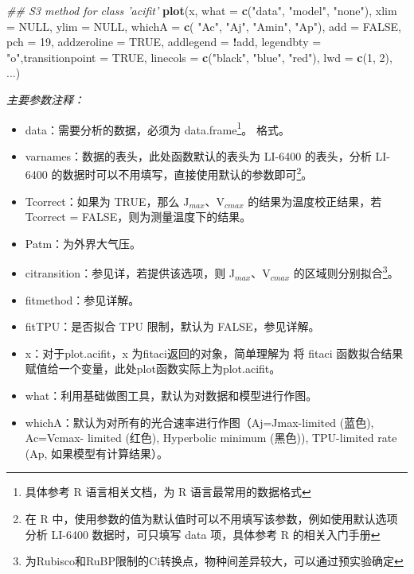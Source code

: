 \documentclass[
]{krantz}
\makeatletter
\newenvironment{Shaded}{\begin{snugshade}}{\end{snugshade}}
\newcommand{\CommentTok}[1]{\textcolor[rgb]{0.56,0.35,0.01}{\textit{#1}}}
\newcommand{\DataTypeTok}[1]{\textcolor[rgb]{0.13,0.29,0.53}{#1}}
\newcommand{\DecValTok}[1]{\textcolor[rgb]{0.00,0.00,0.81}{#1}}
\newcommand{\KeywordTok}[1]{\textcolor[rgb]{0.13,0.29,0.53}{\textbf{#1}}}
\newcommand{\NormalTok}[1]{#1}
\newcommand{\OperatorTok}[1]{\textcolor[rgb]{0.81,0.36,0.00}{\textbf{#1}}}
\newcommand{\OtherTok}[1]{\textcolor[rgb]{0.56,0.35,0.01}{#1}}
\newcommand{\StringTok}[1]{\textcolor[rgb]{0.31,0.60,0.02}{#1}}
\providecommand{\tightlist}{%
  \setlength{\itemsep}{0pt}\setlength{\parskip}{0pt}}
\newenvironment{kframe}{%
\medskip{}
\setlength{\fboxsep}{.8em}
 \def\at@end@of@kframe{}%
 \ifinner\ifhmode%
  \def\at@end@of@kframe{\end{minipage}}%
  \begin{minipage}{\columnwidth}%
 \fi\fi%
 \def\FrameCommand##1{\hskip\@totalleftmargin \hskip-\fboxsep
 \colorbox{shadecolor}{##1}\hskip-\fboxsep
     \hskip-\linewidth \hskip-\@totalleftmargin \hskip\columnwidth}%
 \MakeFramed {\advance\hsize-\width
   \@totalleftmargin\z@ \linewidth\hsize
   \@setminipage}}%
 {\par\unskip\endMakeFramed%
 \at@end@of@kframe}
\renewenvironment{Shaded}{\begin{kframe}}{\end{kframe}}
\makeatother
\begin{document}
\begin{Shaded}
\begin{Highlighting}[]
\CommentTok{## S3 method for class 'acifit'}
\KeywordTok{plot}\NormalTok{(x, }\DataTypeTok{what =} \KeywordTok{c}\NormalTok{(}\StringTok{"data"}\NormalTok{, }\StringTok{"model"}\NormalTok{, }\StringTok{"none"}\NormalTok{),}
     \DataTypeTok{xlim =} \OtherTok{NULL}\NormalTok{, }\DataTypeTok{ylim =} \OtherTok{NULL}\NormalTok{, }\DataTypeTok{whichA =} \KeywordTok{c}\NormalTok{(}
       \StringTok{"Ac"}\NormalTok{, }\StringTok{"Aj"}\NormalTok{, }\StringTok{"Amin"}\NormalTok{, }\StringTok{"Ap"}\NormalTok{), }\DataTypeTok{add =} \OtherTok{FALSE}\NormalTok{,}
\DataTypeTok{pch =} \DecValTok{19}\NormalTok{, }\DataTypeTok{addzeroline =} \OtherTok{TRUE}\NormalTok{, }\DataTypeTok{addlegend =} 
  \OperatorTok{!}\NormalTok{add, }\DataTypeTok{legendbty =} \StringTok{"o"}\NormalTok{,}\DataTypeTok{transitionpoint =} \OtherTok{TRUE}\NormalTok{, }
\DataTypeTok{linecols =} \KeywordTok{c}\NormalTok{(}\StringTok{"black"}\NormalTok{, }\StringTok{"blue"}\NormalTok{, }\StringTok{"red"}\NormalTok{), }\DataTypeTok{lwd =} \KeywordTok{c}\NormalTok{(}\DecValTok{1}\NormalTok{,}
\DecValTok{2}\NormalTok{), ...)}
\end{Highlighting}
\end{Shaded}

\emph{主要参数注释：}

\begin{itemize}
\tightlist
\item
  data：需要分析的数据，必须为 data.frame\footnote{具体参考 R 语言相关文档，为 R 语言最常用的数据格式}。
  格式。
\item
  varnames：数据的表头，此处函数默认的表头为 LI-6400 的表头，分析 LI-6400 的数据时可以不用填写，直接使用默认的参数即可\footnote{在 R 中，使用参数的值为默认值时可以不用填写该参数，例如使用默认选项分析 LI-6400 数据时，可只填写 data 项，具体参考
    R 的相关入门手册}。
\item
  Tcorrect：如果为 TRUE，那么 J\(_{max}\)、V\(_{cmax}\) 的结果为温度校正结果，若 Tcorrect = FALSE，则为测量温度下的结果。
\item
  Patm：为外界大气压。
\item
  citransition：参见详，若提供该选项，则 J\(_{max}\)、V\(_{cmax}\)
  的区域则分别拟合\footnote{为Rubisco和RuBP限制的Ci转换点，物种间差异较大，可以通过预实验确定}。
\item
  fitmethod：参见详解。
\item
  fitTPU：是否拟合 TPU 限制，默认为 FALSE，参见详解。
\item
  x：对于plot.acifit，x 为fitaci返回的对象，简单理解为 将 fitaci 函数拟合结果赋值给一个变量，此处plot函数实际上为plot.acifit。
\item
  what：利用基础做图工具，默认为对数据和模型进行作图。
\item
  whichA：默认为对所有的光合速率进行作图（Aj=Jmax-limited (蓝色), Ac=Vcmax- limited (红色),
  Hyperbolic minimum (黑色)), TPU-limited rate (Ap, 如果模型有计算结果）。
\end{itemize}
\end{document}
